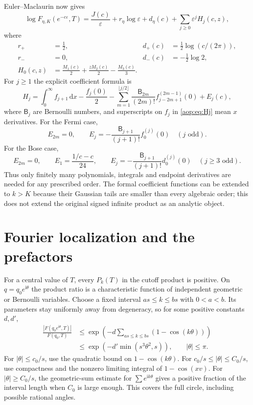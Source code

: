 \documentclass[11pt]{article}
\theoremstyle{remark}\newtheorem{remark}[theorem]{Remark}
\newcommand{\eps}{\varepsilon}
\newcommand{\ii}{\mathrm i}
\newcommand{\dd}{\,\mathrm d}
\begin{document}
Euler--Maclaurin now gives
\begin{equation}\label{aop:eq:productexp}
 \log F_{\eta,K}(e^{-c\eps},T)
 =\frac{J(c)}\eps+r_\eta\log\eps+d_\eta(c)
          +\sum_{j\ge0}\eps^jH_j(c,z),
\end{equation}
where
\begin{align}
 r_+&=\tfrac12,&d_+(c)&=\tfrac12\log(c/(2\pi)),\\
 r_-&=0,&d_-(c)&=-\tfrac12\log2,\\
 H_0(c,z)&=\frac{M_1(c)}2+\frac{zM_2(c)}2-\frac{M_3(c)}3.
 \label{aop:eq:H0}
\end{align}
For $j\ge1$ the explicit coefficient formula is
\begin{equation}\label{aop:eq:Hj}
 H_j=\int_0^\infty f_{j+1}\dd x-\frac{f_j(0)}2
 -\sum_{m=1}^{\lfloor j/2\rfloor}\frac{\mathsf B_{2m}}{(2m)!}
        f_{j-2m+1}^{(2m-1)}(0)+E_j(c),
\end{equation}
where $\mathsf B_j$ are Bernoulli numbers, and superscripts on $f_j$
in \eqref{aop:eq:Hj} mean $x$ derivatives.
For the Fermi case,
\[
 E_{2m}=0,\qquad E_j=-\frac{\mathsf B_{j+1}}{(j+1)!}f_0^{(j)}(0)
 \quad(j\text{ odd}).
\]
For the Bose case,
\[
 E_{2m}=0,\qquad E_1=\frac{1/c-c}{24},\qquad
 E_j=-\frac{\mathsf B_{j+1}}{(j+1)!}d_0^{(j)}(0)
 \quad(j\ge3\text{ odd}).
\]
Thus only finitely many polynomials, integrals and endpoint derivatives
are needed for any prescribed order. The formal coefficient functions
can be extended to $k>K$ because their Gaussian tails are smaller than
every algebraic order; this does not extend the original signed infinite
product as an analytic object.

\section{Fourier localization and the prefactors}\label{aop:sec:fourier}

For a central value of $T$, every $P_k(T)$ in the cutoff product is
positive. On $q=q_0e^{\ii\theta}$ the product ratio is a characteristic
function of independent geometric or Bernoulli variables. Choose a fixed
interval $as\le k\le bs$ with $0<a<b$. Its parameters stay uniformly
away from degeneracy, so for some positive constants $d,d'$,
\begin{align}
 \frac{|F(q_0e^{\ii\theta},T)|}{F(q_0,T)}
 &\le\exp\left(-d\sum_{as\le k\le bs}(1-\cos(k\theta))\right)\\
 &\le\exp(-d'\min(s^3\theta^2,s)),\qquad |\theta|\le\pi.
 \label{aop:eq:arcs}
\end{align}
For $|\theta|\le c_0/s$, use the quadratic bound on $1-\cos(k\theta)$.
For $c_0/s\le|\theta|\le C_0/s$, use compactness and the nonzero
limiting integral of $1-\cos(xv)$. For $|\theta|\ge C_0/s$, the
geometric-sum estimate for $\sum e^{\ii k\theta}$ gives a positive
fraction of the interval length when $C_0$ is large enough. This covers
the full circle, including possible rational angles.
\end{document}
